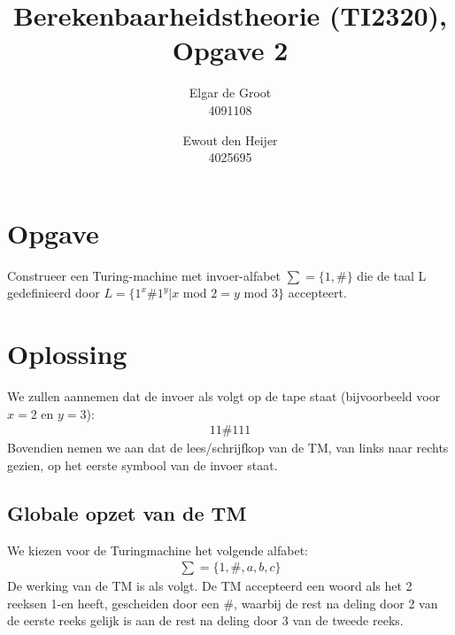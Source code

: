 \documentclass[a4paper]{article}
\title{Berekenbaarheidstheorie (TI2320), Opgave 2}
\author{Elgar de Groot\\ 
4091108
\and Ewout den Heijer\\
4025695}
\date{}
\begin{document}
\maketitle %

\section*{Opgave}
Construeer een Turing-machine met invoer-alfabet $\sum = \{1, \#\}$ die de taal L gedefinieerd door $L=\{1^x\#1^y | x$ mod $2 = y$ mod $3\}$
accepteert.

\section*{Oplossing}

We zullen aannemen dat de invoer als volgt op de tape staat (bijvoorbeeld voor $x=2$ en $y=3$):
\begin{align*}
11\#111
\end{align*}
Bovendien nemen we aan dat de lees/schrijfkop van de TM, van links naar rechts gezien, op het eerste symbool van de invoer staat.

\subsection*{Globale opzet van de TM}
We kiezen voor de Turingmachine het volgende alfabet: 
\begin{align*}
\sum = \{1,\#,a,b,c\}
\end{align*}
De werking van de TM is als volgt. De TM accepteerd een woord als het 2 reeksen 1-en heeft, gescheiden door een \#, waarbij de rest na deling door 2 van de eerste reeks gelijk is aan de rest na deling door 3 van de tweede reeks.
\end{document}
